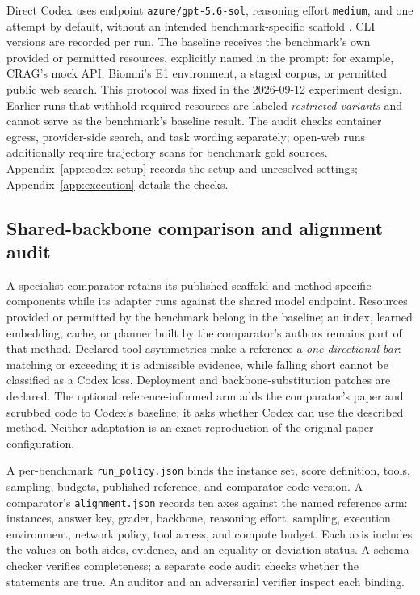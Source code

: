 Direct Codex uses endpoint \texttt{azure/gpt-5.6-sol}, reasoning effort \texttt{medium}, and one
attempt by default, without an intended benchmark-specific scaffold \citep{openai2026codex}.
CLI versions are recorded per run. The baseline receives the benchmark's own provided or
permitted resources, explicitly named in the prompt: for example, CRAG's mock API, Biomni's
E1 environment, a staged corpus, or permitted public web search. This protocol was fixed in the
2026-09-12 experiment design. Earlier runs that withhold required resources are labeled
\emph{restricted variants} and cannot serve as the benchmark's baseline result. The audit checks
container egress, provider-side search, and task wording separately; open-web runs additionally
require trajectory scans for benchmark gold sources. Appendix~\ref{app:codex-setup} records the
setup and unresolved settings; Appendix~\ref{app:execution} details the checks.

\subsection{Shared-backbone comparison and alignment audit}
\label{sec:method:alignment}

A specialist comparator retains its published scaffold and method-specific components while its
adapter runs against the shared model endpoint. Resources provided or permitted by the benchmark
belong in the baseline; an index, learned embedding, cache, or planner built by the comparator's
authors remains part of that method. Declared tool asymmetries make a reference a
\emph{one-directional bar}: matching or exceeding it is admissible evidence, while falling short
cannot be classified as a Codex loss. Deployment and backbone-substitution patches are declared.
The optional reference-informed arm adds the comparator's paper and scrubbed code to Codex's
baseline; it asks whether Codex can use the described method. Neither adaptation is an exact
reproduction of the original paper configuration.

A per-benchmark \texttt{run\_policy.json} binds the instance set, score definition, tools, sampling,
budgets, published reference, and comparator code version. A comparator's \texttt{alignment.json}
records ten axes against the named reference arm: instances, answer key, grader, backbone,
reasoning effort, sampling, execution environment, network policy, tool access, and compute
budget. Each axis includes the values on both sides, evidence, and an equality or deviation
status. A schema checker verifies completeness; a separate code audit checks whether the
statements are true. An auditor and an adversarial verifier inspect each binding.

